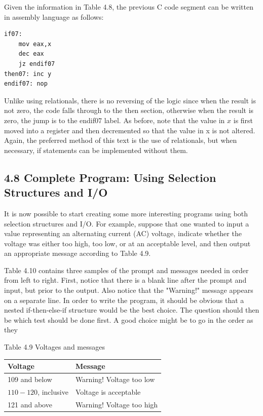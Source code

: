 \documentclass[10pt]{book}
\begin{document}
Given the information in Table 4.8, the previous C code segment can be written in assembly language as follows:

\begin{verbatim}
if07:
    mov eax,x
    dec eax
    jz endif07
then07: inc y
endif07: nop
\end{verbatim}

Unlike using relationals, there is no reversing of the logic since when the result is not zero, the code falls through to the then section, otherwise when the result is zero, the jump is to the endif07 label. As before, note that the value in $x$ is first moved into a register and then decremented so that the value in x is not altered. Again, the preferred method of this text is the use of relationals, but when necessary, if statements can be implemented without them.

\subsection*{4.8 Complete Program: Using Selection Structures and I/O}
It is now possible to start creating some more interesting programs using both selection structures and I/O. For example, suppose that one wanted to input a value representing an alternating current (AC) voltage, indicate whether the voltage was either too high, too low, or at an acceptable level, and then output an appropriate message according to Table 4.9.

Table 4.10 contains three samples of the prompt and messages needed in order from left to right. First, notice that there is a blank line after the prompt and input, but prior to the output. Also notice that the "Warning!" message appears on a separate line. In order to write the program, it should be obvious that a nested if-then-else-if structure would be the best choice. The question should then be which test should be done first. A good choice might be to go in the order as they

Table 4.9 Voltages and messages

\begin{center}
\begin{tabular}{|l|l|}
\hline
Voltage & Message \\
\hline
109 and below & Warning! Voltage too low \\
\hline
$110-120$, inclusive & Voltage is acceptable \\
\hline
121 and above & Warning! Voltage too high \\
\hline
\end{tabular}
\end{center}
\end{document}
